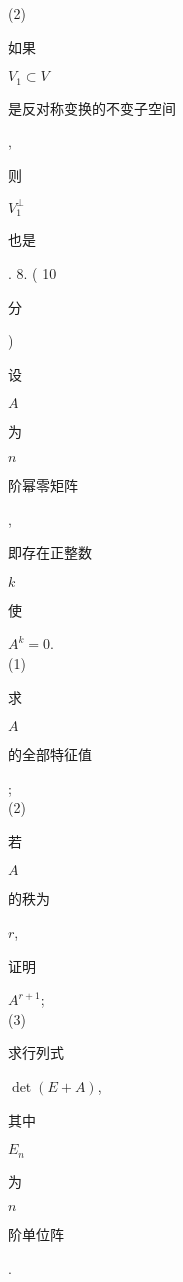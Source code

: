 \documentclass[10pt]{article}
\begin{document}
(2) \begin{CJK}{UTF8}{mj}如果\end{CJK} $V_{1} \subset V$ \begin{CJK}{UTF8}{mj}是反对称变换的不变子空间\end{CJK}, \begin{CJK}{UTF8}{mj}则\end{CJK} $V_{1}^{\perp}$ \begin{CJK}{UTF8}{mj}也是\end{CJK}. 8. ( 10 \begin{CJK}{UTF8}{mj}分\end{CJK}) \begin{CJK}{UTF8}{mj}设\end{CJK} $A$ \begin{CJK}{UTF8}{mj}为\end{CJK} $n$ \begin{CJK}{UTF8}{mj}阶幂零矩阵\end{CJK}, \begin{CJK}{UTF8}{mj}即存在正整数\end{CJK} $k$ \begin{CJK}{UTF8}{mj}使\end{CJK} $A^{k}=0$.\\
(1) \begin{CJK}{UTF8}{mj}求\end{CJK} $A$ \begin{CJK}{UTF8}{mj}的全部特征值\end{CJK};\\
(2) \begin{CJK}{UTF8}{mj}若\end{CJK} $A$ \begin{CJK}{UTF8}{mj}的秩为\end{CJK} $r$, \begin{CJK}{UTF8}{mj}证明\end{CJK} $A^{r+1}$;\\
(3) \begin{CJK}{UTF8}{mj}求行列式\end{CJK} $\operatorname{det}(E+A)$, \begin{CJK}{UTF8}{mj}其中\end{CJK} $E_{n}$ \begin{CJK}{UTF8}{mj}为\end{CJK} $n$ \begin{CJK}{UTF8}{mj}阶单位阵\end{CJK}.
\end{document}
